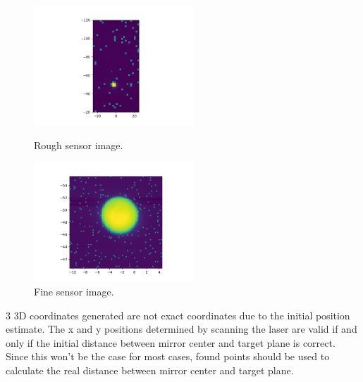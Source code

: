 \begin{figure}[!htb]\centering
    \includegraphics*[width = 6cm]{bilder/project/sensor_im1.png}
    \caption{Rough sensor image.}
    \label{fig:sensor_rough}

    \includegraphics*[width = 6cm]{bilder/project/sensor_im2.png}
    \caption{Fine sensor image.}
    \label{fig:sensor_rough}
\end{figure}





3 3D coordinates generated are not exact coordinates due to the
initial position estimate. The x and y positions determined by
scanning the laser are valid if and only if the initial distance
between mirror center and target plane is correct. Since this won't
be the case for most cases, found points should be used to calculate
the real distance between mirror center and target plane.



